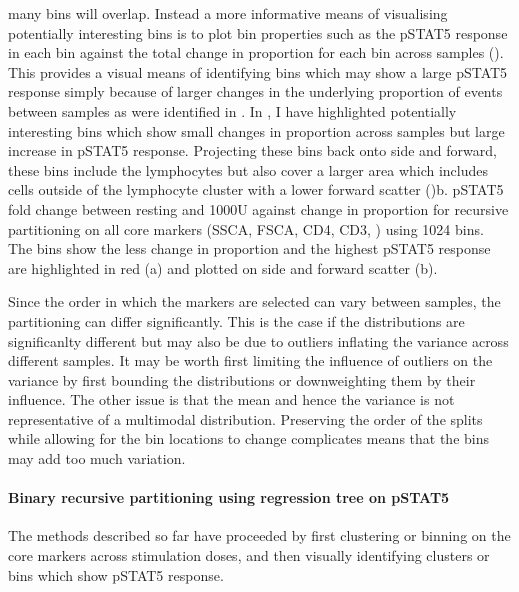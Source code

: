 many bins will overlap. Instead a more informative means of visualising potentially interesting bins is to plot
bin properties such as the pSTAT5 response in each bin against the total change in proportion for each bin across samples
().
This provides a visual means of identifying bins which may show a large pSTAT5 response simply
because of larger changes in the underlying proportion of events between samples as were identified
in .
In , I have highlighted potentially interesting bins which show small changes in proportion across samples
but large increase in pSTAT5 response.  Projecting these bins back onto side and forward, these bins include the lymphocytes but also
cover a larger area which includes cells outside of the lymphocyte cluster with a lower forward scatter ()b.
{ pSTAT5 fold change between resting and 1000U against change in proportion for recursive partitioning on all core markers (SSCA, FSCA, CD4, CD3, ) using 1024 bins. }
{ The bins show the less change in proportion and the highest pSTAT5 response are highlighted in red (a) and plotted on side and forward scatter (b). }

Since the order in which the markers are selected can vary between samples, the partitioning can differ significantly.
This is the case if the distributions are significanlty different but may also be due to outliers inflating the variance across different samples.
It may be worth first limiting the influence of outliers on the variance by first bounding the distributions
or downweighting them by their influence.
The other issue is that the mean and hence the variance is not representative of a multimodal distribution.
Preserving the order of the splits while allowing for the bin locations to change complicates means that the bins
may add too much variation.

\paragraph{Binary recursive partitioning using regression tree on pSTAT5}

The methods described so far have proceeded by first clustering or binning on the core markers across stimulation doses,
and then visually identifying clusters or bins which show pSTAT5 response.

